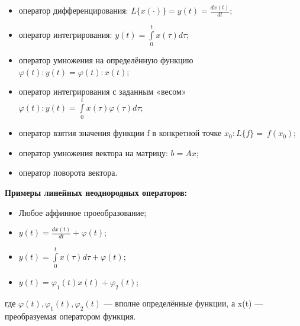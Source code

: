 \documentclass[12pt,a4paper]{article}
\begin{document}
\begin{itemize}
\item оператор дифференцирования: $L\{x(\cdot)\} = y(t) = \frac {dx(t)} {dt}$;
\item оператор интегрирования: $y(t) = \int\limits_0^t x(\tau)d\tau$;
\item оператор умножения на определённую функцию $\varphi(t)\colon y(t) =  \varphi(t)\colon x(t)$;
\item оператор интегрирования с заданным «весом» $\varphi(t)\colon y(t) =  \int\limits_0^t x(\tau)\varphi(\tau)d\tau$;
\item оператор взятия значения функции f в конкретной точке $x_0: L\{f\} = ~f(x_0)$;
\item оператор умножения вектора на матрицу: $ b = Ax$;
\item оператор поворота вектора.
\end{itemize}
{\large{\bf Примеры линейных неоднородных операторов:}}


\begin{itemize}
\item Любое аффинное проеобразование;
\item $y(t) = \frac {dx(t)} {dt} + \varphi(t)$;
\item $y(t) = \int\limits_0^t x(\tau)d\tau+\varphi(t)$;
\item $y(t) = \varphi_1(t)x(t)+\varphi_2(t)$;
\end{itemize}
где $ \varphi(t), \varphi_1(t), \varphi_2(t)$ --- вполне определённые функции, а x(t) --- преобразуемая оператором функция.
\end{document}
